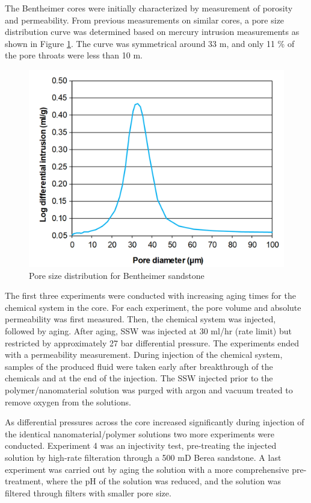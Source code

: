 \documentclass[energies,article,submit,moreauthors,pdftex]{Definitions/mdpi}
\begin{document}
The Bentheimer cores were initially characterized by measurement of porosity and permeability. From previous measurements on similar cores, a pore size distribution curve was determined based on mercury intrusion measurements as shown in Figure \ref{cht:poreSizeDist}. The curve was symmetrical around 33 \micro m, and only 11 \% of the pore throats were less than 10 \micro m.

\begin{figure}[h!]
    \centering
    \includegraphics[width=.7\textwidth]{fig/poreSizeDist.png}
    \caption{Pore size distribution for Bentheimer sandstone}
    \label{cht:poreSizeDist}
\end{figure}

The first three experiments were conducted with increasing aging times for the chemical system in the core. For each experiment, the pore volume and absolute permeability was first measured. Then, the chemical system was injected, followed by aging. After aging, SSW was injected at 30 ml/hr (rate limit) but restricted by approximately 27 bar differential pressure. The experiments ended with a permeability measurement. During injection of the chemical system, samples of the produced fluid were taken early after breakthrough of the chemicals and at the end of the injection. The SSW injected prior to the polymer/nanomaterial solution was purged with argon and vacuum treated to remove oxygen from the solutions.

As differential pressures across the core increased significantly during injection of the identical nanomaterial/polymer solutions two more experiments were conducted. Experiment 4 was an injectivity test, pre-treating the injected solution by high-rate filteration through a 500 mD Berea sandstone. A last experiment was carried out by aging the solution with a more comprehensive pre-treatment, where the pH of the solution was reduced, and the solution was filtered through filters with smaller pore size.
\end{document}
